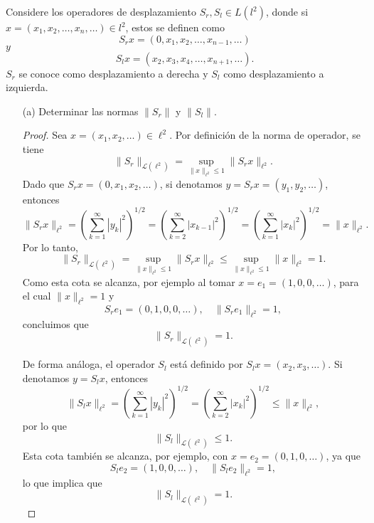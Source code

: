 
Considere los operadores de desplazamiento $S_r, S_l \in L\left(l^2\right)$, donde si $x=\left(x_1, x_2, \ldots, x_n, \ldots\right) \in l^2$, estos se definen como
$$
S_r x=\left(0, x_1, x_2, \ldots, x_{n-1}, \ldots\right)
$$
$y$
$$
S_l x=\left(x_2, x_3, x_4, \ldots, x_{n+1}, \ldots\right) .
$$
$S_r$ se conoce como desplazamiento a derecha y $S_l$ como desplazamiento a izquierda.
\begin{enumerate}
    \item[(a)] Determinar las normas \( \|S_{r}\| \) y \( \|S_{l}\| \).
    \begin{proof}
        Sea \( x = (x_1, x_2, \ldots) \in \ell^2 \). Por definición de la norma de operador, se tiene
\[
\|S_r\|_{\mathcal{L}(\ell^2)} = \sup_{\|x\|_{\ell^2} \leq 1} \|S_r x\|_{\ell^2}.
\]
Dado que \( S_r x = (0, x_1, x_2, \ldots) \), si denotamos \( y = S_r x = (y_1, y_2, \ldots) \), entonces
\[
\|S_r x\|_{\ell^2} = \left( \sum_{k=1}^{\infty} |y_k|^2 \right)^{1/2} = \left( \sum_{k=2}^{\infty} |x_{k-1}|^2 \right)^{1/2} = \left( \sum_{k=1}^{\infty} |x_k|^2 \right)^{1/2} = \|x\|_{\ell^2}.
\]
Por lo tanto,
\[
\|S_r\|_{\mathcal{L}(\ell^2)} = \sup_{\|x\|_{\ell^2} \leq 1} \|S_r x\|_{\ell^2} \leq \sup_{\|x\|_{\ell^2} \leq 1} \|x\|_{\ell^2} = 1.
\]
Como esta cota se alcanza, por ejemplo al tomar \( x = e_1 = (1, 0, 0, \ldots) \), para el cual \( \|x\|_{\ell^2} = 1 \) y
\[
S_r e_1 = (0, 1, 0, 0, \ldots), \quad \|S_r e_1\|_{\ell^2} = 1,
\]
concluimos que
\[
\|S_r\|_{\mathcal{L}(\ell^2)} = 1.
\]

De forma análoga, el operador \( S_l \) está definido por \( S_l x = (x_2, x_3, \ldots) \). Si denotamos \( y = S_l x \), entonces
\[
\|S_l x\|_{\ell^2} = \left( \sum_{k=1}^{\infty} |y_k|^2 \right)^{1/2} = \left( \sum_{k=2}^{\infty} |x_k|^2 \right)^{1/2} \leq \|x\|_{\ell^2},
\]
por lo que
\[
\|S_l\|_{\mathcal{L}(\ell^2)} \leq 1.
\]
Esta cota también se alcanza, por ejemplo, con \( x = e_2 = (0, 1, 0, \ldots) \), ya que
\[
S_l e_2 = (1, 0, 0, \ldots), \quad \|S_l e_2\|_{\ell^2} = 1,
\]
lo que implica que
\[
\|S_l\|_{\mathcal{L}(\ell^2)} = 1.
\]

    \end{proof}
    

\end{enumerate}
